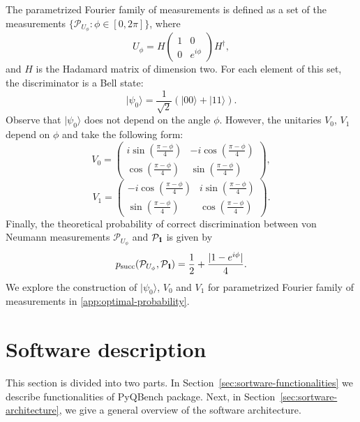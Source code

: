 \documentclass[preprint,12pt, a4paper, dvipsnames]{elsarticle}
\newcommand{\ket}[1]{\ensuremath{|#1\rangle}}
\newcommand{\1}{{\rm 1\hspace{-0.9mm}l}}
\newcommand{\Id}{{\rm 1\hspace{-0.9mm}l}}
\newcommand{\PP}{\mathcal{P}}
\theoremstyle{definition}
\begin{document}
The parametrized Fourier family of measurements is defined as a set of the measurements
$\{\PP_{U_\phi}\colon \phi \in [0, 2\pi]\}$, where 
\begin{equation}
U_\phi = H
\left(\begin{array}{cc}1&0\\0&e^{i \phi}\end{array}\right)  H^\dagger,
\end{equation}
and $H$ is the Hadamard matrix of dimension two. For each element of this set, the discriminator is a Bell state:
\begin{equation}
\ket{\psi_{0}} = \frac{1}{\sqrt{2}} \left( \ket{00} + \ket{11} \right).
\end{equation}
Observe that $\ket{\psi_0}$ does not depend on the angle $\phi$. However, the unitaries $V_0$,
$V_1$ depend on $\phi$ and take the following form:
\begin{equation}
V_0 = \left(\begin{array}{cc}i \sin\left( \frac{\pi - \phi}{4} \right)&-i
\cos\left( \frac{\pi - \phi}{4} \right)\\ \cos\left( \frac{\pi -
	\phi}{4}\right)& \sin\left( \frac{\pi - \phi}{4} \right)\end{array}\right),
\end{equation}
\begin{equation}
V_1 = \left(\begin{array}{cc}-i \cos\left(\frac{\pi - \phi}{4}\right) &i
\sin\left( \frac{\pi - \phi}{4}\right)\\\sin\left( \frac{\pi - \phi}{4} \right)
&  \cos\left( \frac{\pi - \phi}{4} \right) \end{array}\right).
\end{equation}
Finally, the theoretical probability of correct discrimination between von Neumann
measurements $\PP_{U_\phi}$ and $\PP_{\Id}$ is given by
\begin{equation}
p_{\text{succ}}(\PP_{U_\phi}, \PP_{\Id}) = \frac{1}{2} + \frac{|1 - e^{i \phi}  |}{4} .
\end{equation}
We explore the construction of $\ket{\psi_0}$, $V_0$ and $V_1$ for parametrized Fourier family of measurements in
\ref{app:optimal-probability}.

 \section{Software description}
 \label{}
 This section is divided into two parts.
 In Section~\ref{sec:sortware-functionalities} we describe functionalities of PyQBench
 package. Next, in Section~\ref{sec:sortware-architecture}, we give a general overview of the
 software architecture.
\end{document}
